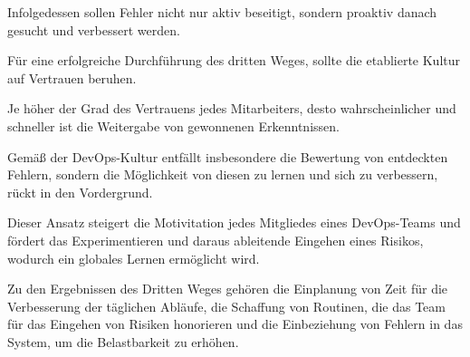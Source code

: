 Infolgedessen sollen Fehler nicht nur aktiv beseitigt, sondern proaktiv danach gesucht und verbessert werden. \cite[S. 255]{tiemeyer_handbuch_2021}

Für eine erfolgreiche Durchführung des dritten Weges, sollte die etablierte Kultur auf Vertrauen beruhen. 

Je höher der Grad des Vertrauens jedes Mitarbeiters, desto wahrscheinlicher und schneller ist die Weitergabe von gewonnenen Erkenntnissen. \cite[S. 357]{kim_phoenix_2014}

Gemäß der DevOps-Kultur entfällt insbesondere die Bewertung von entdeckten Fehlern, sondern die Möglichkeit von diesen zu lernen und sich zu verbessern, rückt in den Vordergrund. 

Dieser Ansatz steigert die Motivitation jedes Mitgliedes eines DevOps-Teams und fördert das Experimentieren und daraus ableitende Eingehen eines Risikos, wodurch ein globales Lernen ermöglicht wird. 

Zu den Ergebnissen des Dritten Weges gehören die Einplanung von Zeit für die Verbesserung der täglichen Abläufe, die Schaffung von Routinen, die das Team für das Eingehen von Risiken honorieren und die Einbeziehung von Fehlern in das System, um die Belastbarkeit zu erhöhen.


